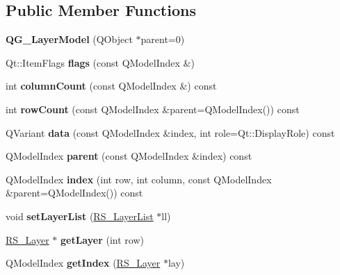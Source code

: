 \subsection*{Public Member Functions}
\begin{DoxyCompactItemize}
\item 
\hypertarget{classQG__LayerModel_a4aec52c1b6e64506ca5ace4dae7f568b}{{\bfseries Q\-G\-\_\-\-Layer\-Model} (Q\-Object $\ast$parent=0)}\label{classQG__LayerModel_a4aec52c1b6e64506ca5ace4dae7f568b}

\item 
\hypertarget{classQG__LayerModel_af8cadfc27d92eca5d8be0733d5a5171c}{Qt\-::\-Item\-Flags {\bfseries flags} (const Q\-Model\-Index \&)}\label{classQG__LayerModel_af8cadfc27d92eca5d8be0733d5a5171c}

\item 
\hypertarget{classQG__LayerModel_a650e8b3c4e5ab6289bd0c2dfbb78c66d}{int {\bfseries column\-Count} (const Q\-Model\-Index \&) const }\label{classQG__LayerModel_a650e8b3c4e5ab6289bd0c2dfbb78c66d}

\item 
\hypertarget{classQG__LayerModel_aba55fbd29c3142070ae2564fd0d36f75}{int {\bfseries row\-Count} (const Q\-Model\-Index \&parent=Q\-Model\-Index()) const }\label{classQG__LayerModel_aba55fbd29c3142070ae2564fd0d36f75}

\item 
\hypertarget{classQG__LayerModel_aa39a845ba2b001295d49ff6d362e46d0}{Q\-Variant {\bfseries data} (const Q\-Model\-Index \&index, int role=Qt\-::\-Display\-Role) const }\label{classQG__LayerModel_aa39a845ba2b001295d49ff6d362e46d0}

\item 
\hypertarget{classQG__LayerModel_a553ade6c1a4487a767cfa535c74a5560}{Q\-Model\-Index {\bfseries parent} (const Q\-Model\-Index \&index) const }\label{classQG__LayerModel_a553ade6c1a4487a767cfa535c74a5560}

\item 
\hypertarget{classQG__LayerModel_a176e7b1f3e3c4878ea7d099fb5612f90}{Q\-Model\-Index {\bfseries index} (int row, int column, const Q\-Model\-Index \&parent=Q\-Model\-Index()) const }\label{classQG__LayerModel_a176e7b1f3e3c4878ea7d099fb5612f90}

\item 
\hypertarget{classQG__LayerModel_a591c3ddc23835f4fc487ca689f7471d1}{void {\bfseries set\-Layer\-List} (\hyperlink{classRS__LayerList}{R\-S\-\_\-\-Layer\-List} $\ast$ll)}\label{classQG__LayerModel_a591c3ddc23835f4fc487ca689f7471d1}

\item 
\hypertarget{classQG__LayerModel_a2b0588f3bda6be9bf78b6a2db1b3ac71}{\hyperlink{classRS__Layer}{R\-S\-\_\-\-Layer} $\ast$ {\bfseries get\-Layer} (int row)}\label{classQG__LayerModel_a2b0588f3bda6be9bf78b6a2db1b3ac71}

\item 
\hypertarget{classQG__LayerModel_a51be8f9aaa17efea9e3f6a8c8aa3fceb}{Q\-Model\-Index {\bfseries get\-Index} (\hyperlink{classRS__Layer}{R\-S\-\_\-\-Layer} $\ast$lay)}\label{classQG__LayerModel_a51be8f9aaa17efea9e3f6a8c8aa3fceb}

\end{DoxyCompactItemize}


